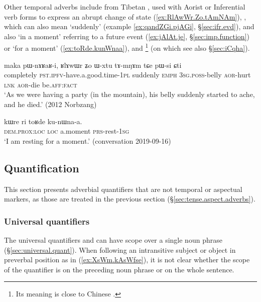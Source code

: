 Other temporal adverbs include  from Tibetan , used with Aorist or Inferential verb forms to express an abrupt change of state  (\ref{ex:RlAwWr.Zo.tAmNAm}), , which can also mean `suddenly' (example \ref{ex:qandZGi.pjAGi}, §\ref{sec:ifr.evd}), and also  `in a moment' referring to a future event (\ref{ex:jAlAt.je}, §\ref{sec:imp.function}) or `for a moment' (\ref{ex:toRde.kunWnaa}), and \footnote{Its meaning is close to Chinese .} (on which see also §\ref{sec:iCqha}).


\begin{exe}
\ex \label{ex:RlAwWr.Zo.tAmNAm}
\gll maka pɯ-nɤʁaʁ-i, ʁlɤwɯr ʑo ɯ-xtu tɤ-mŋɤm tɕe pɯ-si ɕti  \\
completely \textsc{pst}.\textsc{ipfv}-have.a.good.time-\textsc{1pl} suddenly \textsc{emph} \textsc{3sg}.\textsc{poss}-belly \textsc{aor}-hurt \textsc{lnk} \textsc{aor}-die be.\textsc{aff}:\textsc{fact} \\
\glt `As we were having a party (in the mountain), his belly suddenly started to ache, and he died.' (2012 Norbzang)
\end{exe}
 

\begin{exe}
\ex \label{ex:toRde.kunWnaa}
\gll kɯre ri toʁde ku-nɯna-a. \\
\textsc{dem}.\textsc{prox}:\textsc{loc} \textsc{loc} a.moment \textsc{prs}-rest-\textsc{1sg} \\
\glt `I am resting for a moment.' (conversation 2019-09-16)
\end{exe}

\subsection{Quantification} \label{sec:quantification.adverbs}
  This section presents adverbial quantifiers that are not temporal or aspectual markers, as those are treated in the previous section (§\ref{sec:tense.aspect.adverbs}).
 
\subsubsection{Universal quantifiers}  \label{sec:universal.quantification.adverbs}
The universal quantifiers  and  can have scope over a single noun phrase  (§\ref{sec:universal.quant}). When following an intransitive subject or object in preverbal position as in (\ref{ex:XsWm.kAsWfse}), it is not clear whether the scope of the quantifier is on the preceding noun phrase or on the whole sentence.  

